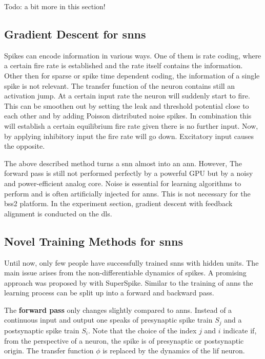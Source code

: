 Todo: a bit more in this section!



\subsection{Gradient Descent for \glspl{snn}}

Spikes can encode information in various ways. One of them is rate coding, where a certain fire rate is established and the rate itself contains the information. Other then for sparse or spike time dependent coding, the information of a single spike is not relevant. The transfer function of the neuron contains still an activation jump. At a certain input rate the neuron will suddenly start to fire. This can be smoothen out by setting the leak and threshold potential close to each other and by adding Poisson distributed noise spikes. In combination this will establish a certain equilibrium fire rate given there is no further input. Now, by applying inhibitory input the fire rate will go down. Excitatory input causes the opposite.

The above described method turns a \gls{snn} almost into an \gls{ann}. However, The forward pass is still not performed perfectly by a powerful GPU but by a noisy and power-efficient analog core. Noise is essential for learning algorithms to perform and is often artificially injected for \glspl{ann}. This is not necessary for the \gls{bss2} platform. In the experiment section, gradient descent with feedback alignment is conducted on the \gls{dls}.


\subsection{Novel Training Methods for \glspl{snn}}


Until now, only few people have successfully trained \glspl{snn} with hidden units. The main issue arises from the non-differentiable dynamics of spikes. A promising approach was proposed by \cite{zenke2018superspike} with SuperSpike. Similar to the training of \glspl{ann} the learning process can be split up into a forward and backward pass. 

The \textbf{forward pass} only changes slightly compared to \glspl{ann}. Instead of a continuous input and output one speaks of presynaptic spike train $S_j$ and a postsynaptic spike train $S_i$. Note that the choice of the index $j$ and $i$ indicate if, from the perspective of a neuron, the spike is of presynaptic or postsynaptic origin. The transfer function $\phi$ is replaced by the dynamics of the \gls{lif} neuron.


